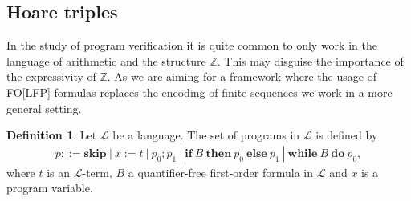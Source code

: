 \documentclass[acmsmall]{acmart}
\theoremstyle{plain}
\theoremstyle{definition}
\newtheorem{definition}[theorem]{Definition}
\newcommand{\calL}{\mathcal{L}}
\newcommand{\Int}{\mathbb{Z}}
\begin{document}
%
%
%
%
%
%
%

\subsection{Hoare triples}

In the study of program verification it is quite common to only work in the language of arithmetic and the structure $\Int$. This may disguise the importance of the expressivity of $\Int$. As we are aiming for a framework where the usage of FO[LFP]-formulas replaces the encoding of finite sequences we work in a more general setting.

\begin{definition}
	Let $\calL$ be a language. The set of programs in $\calL$ is defined by
	\begin{align*}
		p ::= \textbf{skip} ~|~ x := t ~|~ p_0;p_1 ~|~ \textbf{if}~ B~\textbf{then}~ p_0 ~\textbf{else} ~p_1 ~|~ \textbf{while}~ B ~\textbf{do}~ p_0,
	\end{align*}
	where $t$ is an $\calL$-term, $B$ a quantifier-free first-order formula in $\calL$
	and $x$ is a program variable.
\end{definition}
\end{document}
